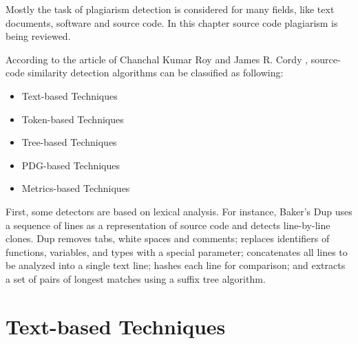 \documentclass{report}
\begin{document}
Mostly the task of plagiarism detection is considered for many fields, like text documents, software and source code. In this chapter source code plagiarism is being reviewed.

According to the article of Chanchal Kumar Roy and James R. Cordy \cite{software_clone_detection}, source-code similarity detection 
algorithms can be classified as following:
\begin{itemize}
	\item Text-based Techniques
	\item Token-based Techniques
	\item Tree-based Techniques
	\item PDG-based Techniques
	\item Metrics-based Techniques
\end{itemize}
First, some detectors are based on lexical analysis. For instance, Baker's Dup \cite{baker} uses a sequence of lines as a representation of source code and detects line-by-line clones. Dup removes tabs, white spaces and comments; replaces identifiers of functions, variables, and types with a special parameter; concatenates all lines to be analyzed into a single text line; hashes each line for comparison; and extracts a set of pairs of longest matches using a suffix tree algorithm\cite{software_clone_detection}.

\section{Text-based Techniques}
\label{sec: text_tech}
\end{document}
